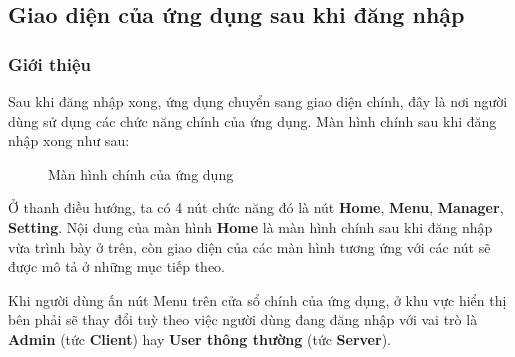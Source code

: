 \subsection{Giao diện của ứng dụng sau khi đăng nhập}
\subsubsection{Giới thiệu}
Sau khi đăng nhập xong, ứng dụng chuyển sang giao diện chính, đây là nơi người dùng sử dụng các chức năng chính của ứng dụng. Màn hình chính sau khi đăng nhập xong như sau:
\begin{figure}[H]
	\caption{Màn hình chính của ứng dụng}
	\label{fig:ServerLogin}
\end{figure}
Ở thanh điều hướng, ta có 4 nút chức năng đó là nút \textbf{Home}, \textbf{Menu}, \textbf{Manager}, \textbf{Setting}. Nội dung của màn hình \textbf{Home} là màn hình chính sau khi đăng nhập vừa trình bày ở trên, còn giao diện của các màn hình tương ứng với các nút sẽ được mô tả ở những mục tiếp theo.

Khi người dùng ấn nút Menu trên cửa sổ chính của ứng dụng, ở khu vực hiển thị bên phải sẽ thay đổi tuỳ theo việc người dùng đang đăng nhập với vai trò là \textbf{Admin} (tức \textbf{Client}) hay \textbf{User thông thường} (tức \textbf{Server}).
